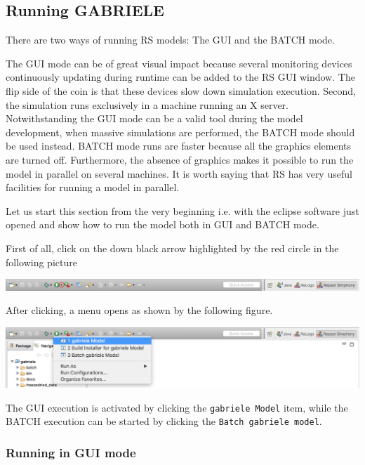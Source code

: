 \documentclass{book}
\begin{document}


\subsection{Running GABRIELE}


There are two ways of running RS models: The GUI and the BATCH mode.

The GUI mode can be of great visual impact because several monitoring devices continuously updating during runtime can be added to the RS GUI window. The flip side of the coin is that these devices slow down simulation execution. Second, the simulation runs exclusively in a machine running an X server. Notwithstanding the GUI mode can be a valid tool during the model development, when massive simulations are performed, the BATCH mode should be used instead. BATCH mode runs are faster because all the graphics elements are turned off. Furthermore, the absence of graphics makes it possible to run the model in parallel on several machines. It is worth saying that RS has very useful facilities for running a model in parallel.


Let us start this section from the very beginning i.e. with the eclipse software just opened and show how to run the model both in GUI and BATCH mode.

First of all, click on the down black arrow highlighted by the red circle in the following picture

\vskip2mm
\noindent
\includegraphics[scale=0.35]{fig_gabriele_rs_execution1}

After clicking, a menu opens as shown by the following figure. 

\vskip2mm
\noindent
\includegraphics[scale=0.35]{fig_gabriele_rs_execution2}

\vskip2mm
The GUI execution is activated by clicking the \verb+gabriele Model+ item, while the BATCH execution can be started by clicking the \verb+Batch gabriele model+.


\subsubsection{Running in GUI mode}
\end{document}

